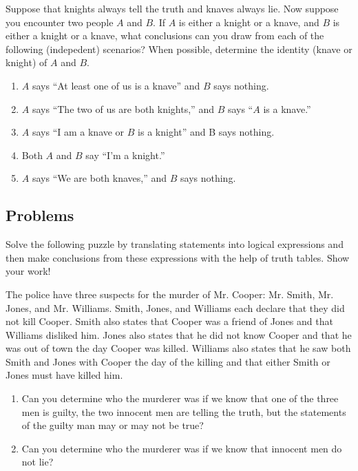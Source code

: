 \documentclass[../main.tex]{subfiles}
\begin{document}
\begin{exercise}
    Suppose that knights always tell the truth and knaves always lie. Now suppose you encounter two people $A$ and $B$. If $A$ is either a knight or a knave, and $B$ is either a knight or a knave, what conclusions can you draw from each of the following (indepedent) scenarios? When possible, determine the identity (knave or knight) of $A$ and $B$.
    \begin{enumerate}[label=(\alph*)]
        \item $A$ says ``At least one of us is a knave'' and $B$ says nothing. 
        \item $A$ says ``The two of us are both knights,'' and $B$ says ``$A$ is a knave.''
        \item $A$ says ``I am a knave or $B$ is a knight'' and B says nothing. 
        \item Both $A$ and $B$ say ``I'm a knight.''
        \item $A$ says ``We are both knaves,'' and $B$ says nothing. 
    \end{enumerate}
\end{exercise}

\subsection{Problems}
Solve the following puzzle by translating statements into logical expressions and then make conclusions from these expressions with the help of truth tables. Show your work!
\begin{homework}
    The police have three suspects for the murder of Mr. Cooper: Mr. Smith, Mr. Jones, and Mr. Williams. Smith, Jones, and Williams each declare that they did not kill Cooper. Smith also states that Cooper was a friend of Jones and that Williams disliked him. Jones also states that he did not know Cooper and that he was out of town the day Cooper was killed. Williams also states that he saw both Smith and Jones with Cooper the day of the killing and that either Smith or Jones must have killed him.
    \begin{enumerate}[label=(\alph*)]
        \item Can you determine who the murderer was if we know that one of the three men is guilty, the two innocent men are telling the truth, but the statements of the guilty man may or may not be true? 
        \item Can you determine who the murderer was if we know that innocent men do not lie? 
    \end{enumerate}
\end{homework}
\end{document}

